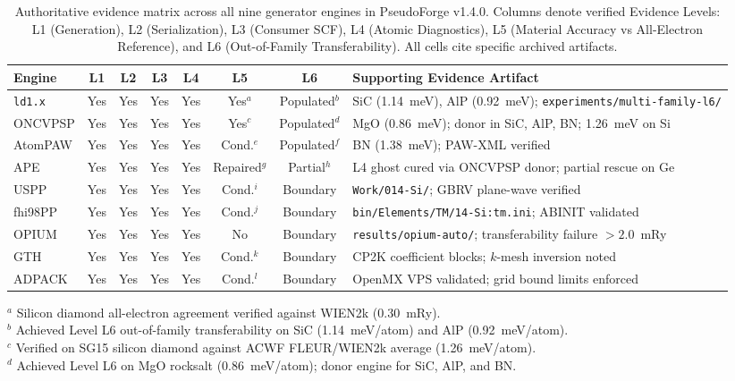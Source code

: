 \documentclass[3p,twocolumn]{elsarticle}
\begin{document}
\begin{table}[t]
\centering
\caption{Authoritative evidence matrix across all nine generator engines in PseudoForge v1.4.0. Columns denote verified Evidence Levels: L1 (Generation), L2 (Serialization), L3 (Consumer SCF), L4 (Atomic Diagnostics), L5 (Material Accuracy vs All-Electron Reference), and L6 (Out-of-Family Transferability). All cells cite specific archived artifacts.}
\label{tab:evidence}
\small
\begin{tabularx}{\textwidth}{@{}l cccc cc X@{}}
\toprule
Engine & L1 & L2 & L3 & L4 & L5 & L6 & Supporting Evidence Artifact \\
\midrule
\texttt{ld1.x} & Yes & Yes & Yes & Yes & Yes$^a$ & Populated$^b$ & SiC (1.14~meV), AlP (0.92~meV); \texttt{experiments/multi-family-l6/} \\
ONCVPSP & Yes & Yes & Yes & Yes & Yes$^c$ & Populated$^d$ & MgO (0.86~meV); donor in SiC, AlP, BN; 1.26~meV on Si \\
AtomPAW & Yes & Yes & Yes & Yes & Cond.$^e$ & Populated$^f$ & BN (1.38~meV); PAW-XML verified \\
APE & Yes & Yes & Yes & Yes & Repaired$^g$ & Partial$^h$ & L4 ghost cured via ONCVPSP donor; partial rescue on Ge \\
USPP & Yes & Yes & Yes & Yes & Cond.$^i$ & Boundary & \texttt{Work/014-Si/}; GBRV plane-wave verified \\
fhi98PP & Yes & Yes & Yes & Yes & Cond.$^j$ & Boundary & \texttt{bin/Elements/TM/14-Si:tm.ini}; ABINIT validated \\
OPIUM & Yes & Yes & Yes & Yes & No & Boundary & \texttt{results/opium-auto/}; transferability failure $>2.0$~mRy \\
GTH & Yes & Yes & Yes & Yes & Cond.$^k$ & Boundary & CP2K coefficient blocks; $k$-mesh inversion noted \\
ADPACK & Yes & Yes & Yes & Yes & Cond.$^l$ & Boundary & OpenMX VPS validated; grid bound limits enforced \\
\bottomrule
\end{tabularx}
\par\smallskip
\raggedright\footnotesize
$^a$ Silicon diamond all-electron agreement verified against WIEN2k (0.30~mRy).\\
$^b$ Achieved Level L6 out-of-family transferability on SiC (1.14~meV/atom) and AlP (0.92~meV/atom).\\
$^c$ Verified on SG15 silicon diamond against ACWF FLEUR/WIEN2k average (1.26~meV/atom).\\
$^d$ Achieved Level L6 on MgO rocksalt (0.86~meV/atom); donor engine for SiC, AlP, and BN.\\

\end{table}
\end{document}
